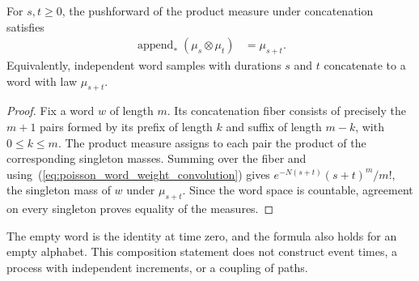 \begin{theorem}
\label{thm:poisson_word_semigroup}
\leanok
{}
For $s,t\geq0$, the pushforward of the product measure under concatenation
satisfies
\begin{align}
 \operatorname{append}_*(\mu_s\otimes\mu_t)&=\mu_{s+t}.
 \label{eq:poisson_word_append_law}
\end{align}
Equivalently, independent word samples with durations $s$ and $t$
concatenate to a word with law $\mu_{s+t}$.
\end{theorem}
\begin{proof}
\leanok
{}
Fix a word $w$ of length $m$.  Its concatenation fiber consists of precisely
the $m+1$ pairs formed by its prefix of length $k$ and suffix of length
$m-k$, with $0\le k\le m$.  The product measure assigns to each pair the
product of the corresponding singleton masses.  Summing over the fiber
and using~(\ref{eq:poisson_word_weight_convolution}) gives
$e^{-N(s+t)}(s+t)^m/m!$, the singleton mass of $w$ under $\mu_{s+t}$.
Since the word space is countable, agreement on every singleton proves
equality of the measures.
\end{proof}

The empty word is the identity at time zero, and the formula also holds
for an empty alphabet.  This composition statement does not construct
event times, a process with independent increments, or a coupling of paths.
